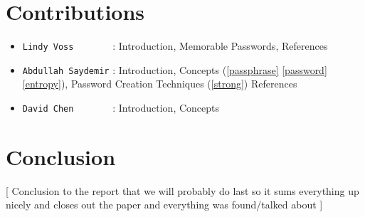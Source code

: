 \documentclass[acmsmall,nonacm]{acmart}
\begin{document}
\section{Contributions}
\begin{itemize}
\item{\verb|Lindy Voss       |} : Introduction, Memorable Passwords, References
\item{\verb|Abdullah Saydemir|} : Introduction, Concepts (\ref{passphrase} \ref{password} \ref{entropy}), Password Creation Techniques (\ref{strong}) References
\item{\verb|David Chen       |} : Introduction, Concepts
\end{itemize}


\section{Conclusion}
\textcolor{beaver}{[ Conclusion to the report that we will probably do last so it sums everything up nicely and closes out the paper and everything was found/talked about ]}



\appendix
\end{document}
